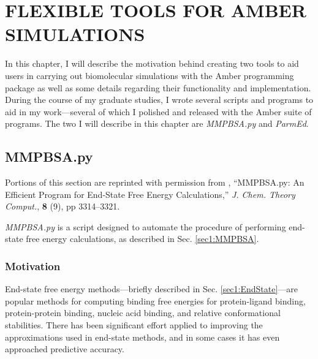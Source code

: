 \chapter{FLEXIBLE TOOLS FOR AMBER SIMULATIONS}
\label{ch6}

In this chapter, I will describe the motivation behind creating two tools to aid
users in carrying out biomolecular simulations with the Amber programming
package as well as some details regarding their functionality and
implementation. During the course of my graduate studies, I wrote several
scripts and programs to aid in my work---several of which I polished and released
with the Amber suite of programs. The two I will describe in this chapter are
\emph{MMPBSA.py} \cite{MMPBSApy} and \emph{ParmEd}.

\section{MMPBSA.py}

Portions of this section are reprinted with permission from
\citeauthor*{MMPBSApy}, ``MMPBSA.py: An Efficient Program for End-State Free
Energy Calculations,'' \emph{J. Chem. Theory Comput.}, \textbf{8} (9), pp
3314--3321. \cite{MMPBSApy}

\emph{MMPBSA.py} is a script designed to automate the procedure of performing
end-state free energy calculations, as described in Sec. \ref{sec1:MMPBSA}.

\subsection{Motivation}

End-state free energy methods---briefly described in Sec.
\ref{sec1:EndState}---are popular methods for computing binding free energies
for protein-ligand binding, \cite{Wang2001, Kuhn2005, Weis2006, Genheden2009,
Wang2001a} protein-protein binding, \cite{Gohlke2003, Gohlke2004, Bradshaw2010,
Wang2001a} nucleic acid binding, \cite{Gouda2002, Wang2001a} and relative
conformational stabilities. \cite{Combelles2008, Brice2011} There has been
significant effort applied to improving the approximations used in end-state
methods, and in some cases it has even approached predictive accuracy.
\cite{Genheden2009, Mikulskis2012}

